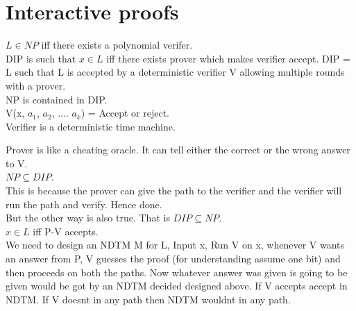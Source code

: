 \documentclass[solution,addpoints,12pt]{exam}
\begin{document}
\section{Interactive proofs}
$L \in NP$ iff there exists a polynomial verifer.\\
DIP is such that $x \in L$ iff there exists prover which makes verifier accept.
DIP = L such that L is accepted by a deterministic verifier V
allowing multiple rounds with a prover.\\
NP is contained in DIP.\\
V(x, $a_1$, $a_2$, .... $a_k$) = Accept or reject.\\
Verifier is a deterministic time machine.

Prover is like a cheating oracle. It can tell either the correct
or the wrong answer to V.\\

$NP \subseteq DIP$.\\
This is because the prover can give the path to the verifier
and the verifier will run the path and verify. Hence done.\\
But the other way is also true. That is $DIP \subseteq NP$.\\
$x \in L$ iff P-V accepts.\\
We need to design an NDTM M for L,
Input x, Run V on x, whenever V wants an answer from
P, V guesses the proof (for understanding assume one bit)
and then proceeds on both the paths. Now whatever
answer was given is going to be given would be got by an NDTM decided
designed above. If V accepts accept in NDTM. If V doesnt in
any path then NDTM wouldnt in any path.\\
\end{document}
